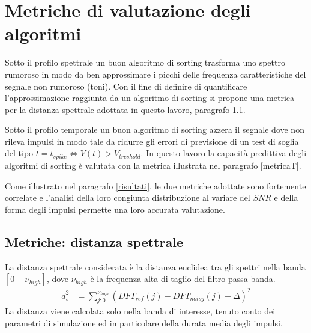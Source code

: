 \documentclass[9pt,twocolumn,twoside]{osajnl}
\begin{document}
\section{Metriche di valutazione degli algoritmi}

Sotto il profilo spettrale un buon algoritmo di sorting trasforma uno spettro rumoroso in modo da ben approssimare i picchi delle frequenza caratteristiche del segnale non rumoroso (toni).
%
%
Con il fine di definire di quantificare l'approssimazione raggiunta da un algoritmo di sorting si propone una metrica per la distanza spettrale adottata in questo lavoro, paragrafo \ref{metricaS}.

Sotto il profilo temporale un buon algoritmo di sorting azzera il segnale dove non rileva impulsi in modo tale da ridurre gli errori di previsione di un test di soglia del tipo
$t = t_{spike} \Leftrightarrow V(t) > V_{treshold}$. In questo lavoro la capacità predittiva degli algoritmi di sorting è valutata con la metrica illustrata nel paragrafo \ref{metricaT}.

Come illustrato nel paragrafo \ref{risultati}, le due metriche adottate sono fortemente correlate e l'analisi della loro congiunta distribuzione al variare del $SNR$ e della forma degli impulsi permette una loro accurata valutazione.


\subsection{Metriche: distanza spettrale}
\label{metricaS}

La distanza spettrale considerata è la distanza euclidea tra gli spettri nella banda $[0-\nu_{high}]$, dove $\nu_{high}$ è la frequenza alta di taglio del filtro passa banda.
% 
%
\begin{align*}
 d_{s}^2 & = \sum_{j:0}^{\nu_{high}}(DFT_{ref}(j) - DFT_{noisy}(j) - \Delta)^2
\end{align*}
%
La distanza viene calcolata solo nella banda di interesse, tenuto conto dei parametri di simulazione ed in particolare della durata media degli impulsi.
\end{document}

